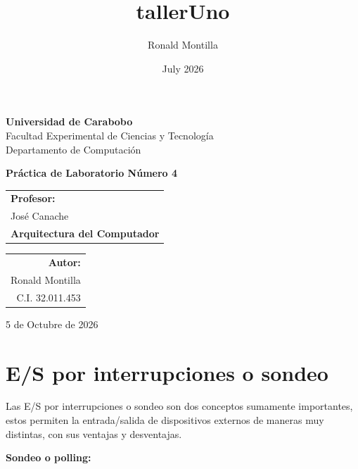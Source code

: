 \documentclass[12pt, a4paper]{article}
\title{tallerUno}
\author{Ronald Montilla}
\date{July 2026}
\begin{document}
\begin{titlepage}
    \centering %

    {\bfseries\LARGE Universidad de Carabobo} \\[0.4cm]
    {\LARGE Facultad Experimental de Ciencias y Tecnología} \\[0.2cm]
    {\LARGE Departamento de Computación} \\[1.5cm]
    

    
    \vfill

    {\bfseries\Huge Práctica de Laboratorio Número 4} \\[0.5cm]
    
    \vfill
    
    \vfill
    \begin{tabular}[t]{l}
        \large\textbf{Profesor:} \\
        \large José Canache \\
        \large\textbf{Arquitectura del Computador}
    \end{tabular}
    \hfill
    \begin{tabular}[t]{r}
        \large\textbf{Autor:} \\
        \large Ronald Montilla \\
        \large C.I. 32.011.453
    \end{tabular}

    {5 de Octubre de 2026}
    
\end{titlepage}
\newpage 
\tableofcontents
\newpage
\section{E/S por interrupciones o sondeo}
Las E/S por interrupciones o sondeo son dos conceptos sumamente importantes, estos permiten la entrada/salida de dispositivos externos de maneras muy distintas, con sus ventajas y desventajas.

\textbf{Sondeo o polling:}
\end{document}
